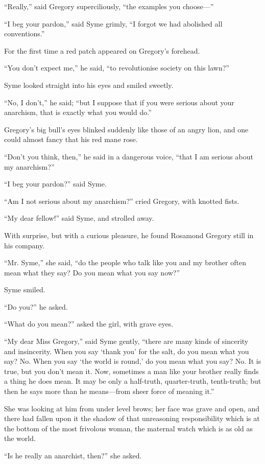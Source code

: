 “Really,” said Gregory superciliously, “the examples you choose⁠—”

“I beg your pardon,” said Syme grimly, “I forgot we had abolished all conventions.”

For the first time a red patch appeared on Gregory’s forehead.

“You don’t expect me,” he said, “to revolutionise society on this lawn?”

Syme looked straight into his eyes and smiled sweetly.

“No, I don’t,” he said; “but I suppose that if you were serious about your anarchism, that is exactly what you would do.”

Gregory’s big bull’s eyes blinked suddenly like those of an angry lion, and one could almost fancy that his red mane rose.

“Don’t you think, then,” he said in a dangerous voice, “that I am serious about my anarchism?”

“I beg your pardon?” said Syme.

“Am I not serious about my anarchism?” cried Gregory, with knotted fists.

“My dear fellow!” said Syme, and strolled away.

With surprise, but with a curious pleasure, he found Rosamond Gregory still in his company.

“Mr. Syme,” she said, “do the people who talk like you and my brother often mean what they say? Do you mean what you say now?”

Syme smiled.

“Do you?” he asked.

“What do you mean?” asked the girl, with grave eyes.

“My dear Miss Gregory,” said Syme gently, “there are many kinds of sincerity and insincerity. When you say ‘thank you’ for the salt, do you mean what you say? No. When you say ‘the world is round,’ do you mean what you say? No. It is true, but you don’t mean it. Now, sometimes a man like your brother really finds a thing he does mean. It may be only a half-truth, quarter-truth, tenth-truth; but then he says more than he means⁠—from sheer force of meaning it.”

She was looking at him from under level brows; her face was grave and open, and there had fallen upon it the shadow of that unreasoning responsibility which is at the bottom of the most frivolous woman, the maternal watch which is as old as the world.

“Is he really an anarchist, then?” she asked.

